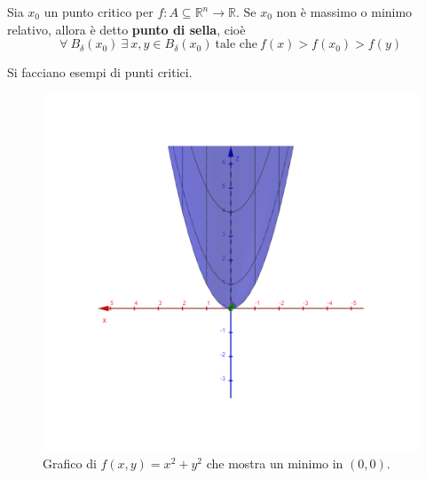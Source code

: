 \begin{definition} \label{Def: Punto di sella}
    Sia $x_0$ un punto critico per $f:A \subseteq \mathbb{R}^n \to \mathbb{R}$. Se $x_0$ non è massimo o minimo relativo, allora è detto \textbf{punto di sella}, cioè
    \begin{equation}
        \forall\ B_\delta(x_0)\ \exists\ x,y \in B_\delta(x_0)\ \text{tale che}\ f(x)>f(x_0)>f(y)
    \end{equation} 
\end{definition}
\newpage
\begin{example}
    Si facciano esempi di punti critici.
    \begin{figure}[H]
        \centering
        \begin{minipage}{0.26\textwidth}
            \centering
            \includegraphics[width=\textwidth]{Capitoli/Capitolo2/Minimo.png}
            \caption{Grafico di $f(x,y)=x^2+y^2$ che mostra un minimo in $(0,0)$.}
        \end{minipage}
        \hspace{1cm}
        \begin{minipage}{0.26\textwidth}
            \centering

\end{minipage}
\end{figure}
\end{example}
